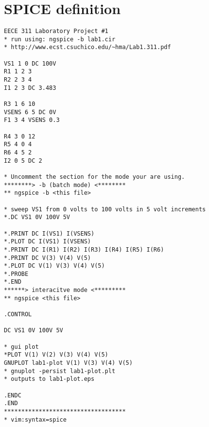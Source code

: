 \documentclass{article}
\begin{document}
\appendix


\section{SPICE definition}\label{sec:spicedef}

{\footnotesize
\begin{verbatim}
EECE 311 Laboratory Project #1
* run using: ngspice -b lab1.cir
* http://www.ecst.csuchico.edu/~hma/Lab1.311.pdf

VS1 1 0 DC 100V
R1 1 2 3
R2 2 3 4
I1 2 3 DC 3.483

R3 1 6 10
VSENS 6 5 DC 0V
F1 3 4 VSENS 0.3

R4 3 0 12
R5 4 0 4
R6 4 5 2
I2 0 5 DC 2

* Uncomment the section for the mode your are using.
********> -b (batch mode) <********
** ngspice -b <this file>

* sweep VS1 from 0 volts to 100 volts in 5 volt increments
*.DC VS1 0V 100V 5V

*.PRINT DC I(VS1) I(VSENS)
*.PLOT DC I(VS1) I(VSENS)
*.PRINT DC I(R1) I(R2) I(R3) I(R4) I(R5) I(R6)
*.PRINT DC V(3) V(4) V(5)
*.PLOT DC V(1) V(3) V(4) V(5)
*.PROBE
*.END
******> interacitve mode <*********
** ngspice <this file>

.CONTROL

DC VS1 0V 100V 5V

* gui plot
*PLOT V(1) V(2) V(3) V(4) V(5)
GNUPLOT lab1-plot V(1) V(3) V(4) V(5)
* gnuplot -persist lab1-plot.plt
* outputs to lab1-plot.eps

.ENDC
.END
***********************************
* vim:syntax=spice

\end{verbatim}
}

\end{document}
